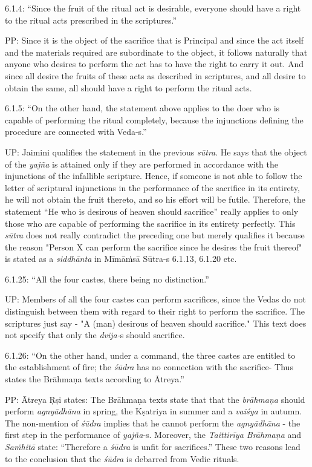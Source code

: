 6.1.4: “Since the fruit of the ritual act is desirable, everyone should have a right to the ritual acts prescribed in the scriptures.”

PP: Since it is the object of the sacrifice that is Principal and since the act itself and the materials required are subordinate to the object, it follows naturally that anyone who desires to perform the act has to have the right to carry it out. And since all desire the fruits of these acts as described in scriptures, and all desire to obtain the same, all should have a right to perform the ritual acts.

6.1.5: “On the other hand, the statement above applies to the doer who is capable of performing the ritual completely, because the injunctions defining the procedure are connected with Veda-s.”

UP: Jaimini qualifies the statement in the previous \textit{sūtra}. He says that the object of the \textit{yajña} is attained only if they are performed in accordance with the injunctions of the infallible scripture. Hence, if someone is not able to follow the letter of scriptural injunctions in the performance of the sacrifice in its entirety, he will not obtain the fruit thereto, and so his effort will be futile. Therefore, the statement “He who is desirous of heaven should sacrifice” really applies to only those who are capable of performing the sacrifice in its entirety perfectly. This \textit{sūtra} does not really contradict the preceding one but merely qualifies it because the reason "Person X can perform the sacrifice since he desires the fruit thereof" is stated as a \textit{siddhānta} in Mīmāṁsā Sūtra-s 6.1.13, 6.1.20 etc.

6.1.25: “All the four castes, there being no distinction.”

UP: Members of all the four castes can perform sacrifices, since the Vedas do not distinguish between them with regard to their right to perform the sacrifice. The scriptures just say - "A (man) desirous of heaven should sacrifice." This text does not specify that only the \textit{dvija-}s should sacrifice.

6.1.26: “On the other hand, under a command, the three castes are entitled to the establishment of fire; the \textit{śūdra} has no connection with the sacrifice- Thus states the Brāhmaṇa texts according to Ātreya.”

PP: Ātreya Ṛṣi states: The Brāhmaṇa texts state that that the \textit{brāhmaṇa} should perform \textit{agnyādhāna} in spring, the Kṣatriya in summer and a \textit{vaiśya} in autumn. The non-mention of \textit{śūdra} implies that he cannot perform the \textit{agnyādhāna} - the first step in the performance of \textit{yajña}-s. Moreover, the \textit{Taittirīya Brāhmaṇa} and \textit{Saṁhitā} state: “Therefore a \textit{śūdra} is unfit for sacrifices.” These two reasons lead to the conclusion that the \textit{śūdra} is debarred from Vedic rituals.

